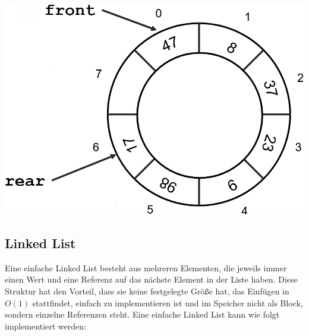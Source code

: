 \documentclass[
../../AuD-Zusammenfassung.tex,
]
{subfiles}
\begin{document}
\vspace*{50pt}
\\
\begin{minipage}[t]{\textwidth}
    \centering
    \includegraphics[scale=0.5]{Pics/CyclicQueue.png}
\end{minipage}
\newpage
\subsection{Linked List}
Eine einfache Linked List besteht aus mehreren Elementen, die jeweils immer einen Wert und eine Referenz auf das nächste Element in der Liste haben. Diese Struktur hat den Vorteil, dass sie keine festgelegte Größe hat, das Einfügen in $O(1)$ stattfindet, einfach zu implementieren ist und im Speicher nicht als Block, sondern einzelne Referenzen steht. Eine einfache Linked List kann wie folgt implementiert werden:



\end{document}
